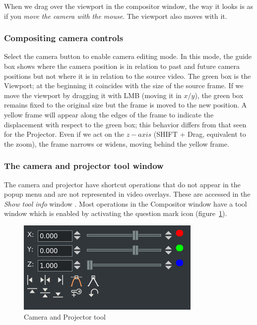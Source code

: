 When we drag over the viewport in the compositor window, the way it looks is as if you \textit{move the camera with the mouse}.  The viewport also moves with it.

\subsubsection*{Compositing camera controls}%
\label{ssub:compositing_camera_controls}

Select the camera button to enable camera editing mode. 
In this mode, the guide box shows where the camera position is in relation to past and future camera positions but not where it is in relation to the source video. 
The green box is the Viewport; at the beginning it coincides with the size of the source frame. If we move the viewport by dragging it with LMB (moving it in $x/y$), the green box remains fixed to the original size but the frame is moved to the new position.  A yellow frame will appear along the edges of the frame to indicate the displacement with respect to the green box; this behavior differs from that seen for the Projector. Even if we act on the $z-axis$ (SHIFT + Drag, equivalent to the zoom), the frame narrows or widens, moving behind the yellow frame.

\subsubsection*{The camera and projector tool window}%
\label{ssub:the_camera_and_projector_tool_window}

The camera and projector have shortcut operations that do not appear in the popup menu and are not represented in video overlays. 
These are accessed in the \emph{Show tool info} window . 
Most operations in the Compositor window have a tool window which is enabled by activating the question mark icon (figure~\ref{fig:camera_tool}).

\begin{figure} 
	\vspace{-2ex}
    \includegraphics[width=0.9\linewidth]{images/camera_tool.png}
    \caption{Camera and Projector tool}
    \label{fig:camera_tool}
\end{figure}

